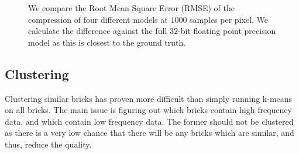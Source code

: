 \begin{figure}[H]
{    }
    \hfill
    \hfill

    \caption{We compare the Root Mean Square Error (RMSE) of the compression of four different models at $1000$ samples per pixel. We calculate the difference against the full 32-bit floating point precision model as this is closest to the ground truth.} \label{fig:block_compression}
\end{figure}
\subsection{Clustering} \label{results:clustering}
Clustering similar bricks has proven more difficult than simply running k-means on all bricks. The main issue is figuring out which bricks contain high frequency data, and which contain low frequency data. The former should not be clustered as there is a very low chance that there will be any bricks which are similar, and thus, reduce the quality.


